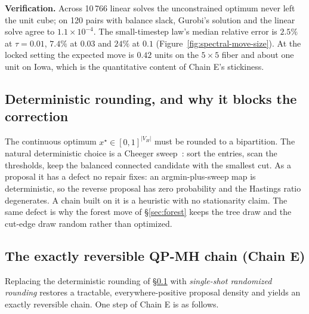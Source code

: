 \documentclass[11pt]{article}
\begin{document}
\textbf{Verification.} Across 10\,766 linear solves the unconstrained
optimum never left the unit cube; on 120 pairs with balance slack,
Gurobi's solution and the linear solve agree to $1.1 \times 10^{-4}$.
The small-timestep law's median relative error is $2.5\%$ at
$\tau = 0.01$, $7.4\%$ at $0.03$ and $24\%$ at $0.1$
(Figure~\ref{fig:spectral-move-size}). At the locked setting the
expected move is $0.42$ units on the $5 \times 5$ fiber and about one
unit on Iowa, which is the quantitative content of Chain E's
stickiness.

\subsection{Deterministic rounding, and why it blocks the correction}\label{sec:rounding}

The continuous optimum $x^\star \in [0,1]^{|V_H|}$ must be rounded to
a bipartition. The natural deterministic choice is a Cheeger
sweep~\cite{chung1997spectral}: sort the entries, scan the thresholds,
keep the balanced connected candidate with the smallest cut. As a
proposal it has a defect no repair fixes: an argmin-plus-sweep map is
deterministic, so the reverse proposal has zero probability and the
Hastings ratio degenerates. A chain built on it is a heuristic with no
stationarity claim. The same defect is why the forest move of
\S\ref{sec:forest} keeps the tree draw and the cut-edge draw random
rather than optimized.

\subsection{The exactly reversible QP-MH chain (Chain E)}\label{sec:qp-mh}

Replacing the deterministic rounding of \S\ref{sec:rounding} with
\emph{single-shot randomized rounding} restores a tractable,
everywhere-positive proposal density and yields an exactly reversible
chain. One step of Chain E is as follows.
\end{document}
